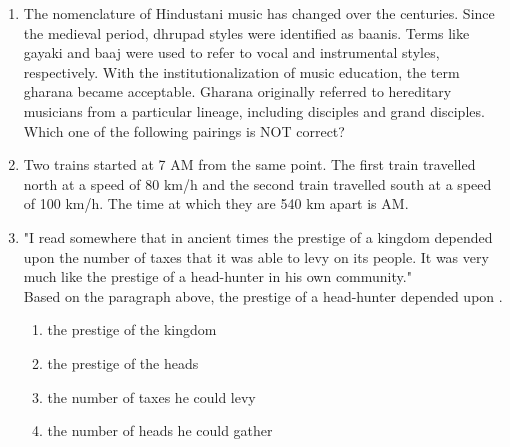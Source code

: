 \documentclass[journal,,12pt,onecolumn]{IEEEtran}
\theoremstyle{remark}
\begin{document}
\begin{enumerate}
    \item The nomenclature of Hindustani music has changed over the centuries. Since the medieval period, dhrupad styles were identified as baanis. Terms like gayaki and baaj were used to refer to vocal and instrumental styles, respectively. With the institutionalization of music education, the term gharana became acceptable. Gharana originally referred to hereditary musicians from a particular lineage, including disciples and grand disciples.\\
    Which one of the following pairings is NOT correct?\\
    \begin{enumerate}
    \end{enumerate}
    \bigskip

    \item Two trains started at 7 AM from the same point. The first train travelled north at a speed of 80 km/h and the second train travelled south at a speed of 100 km/h. The time at which they are 540 km apart is \underline{\hspace{2cm}} AM.\\
    \begin{enumerate}
    \end{enumerate}
    \bigskip
    \item "I read somewhere that in ancient times the prestige of a kingdom depended upon the number of taxes that it was able to levy on its people. It was very much like the prestige of a head-hunter in his own community."\\
    Based on the paragraph above, the prestige of a head-hunter depended upon \underline{\hspace{2cm}}.\\
    \begin{enumerate}
        \item the prestige of the kingdom
        \item the prestige of the heads
        \item the number of taxes he could levy
        \item the number of heads he could gather
    \end{enumerate}
    \bigskip
    \end{enumerate}
\end{document}
